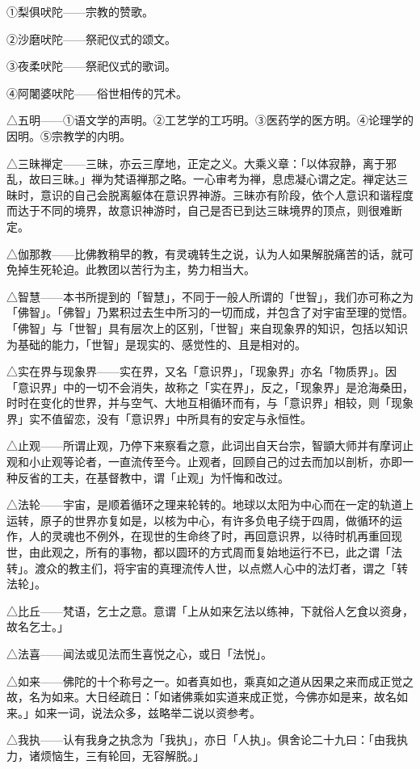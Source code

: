 \documentclass[12pt,twoside,openany]{book}
\begin{document}
①梨俱吠陀——宗教的赞歌。

②沙磨吠陀——祭祀仪式的颂文。

③夜柔吠陀——祭祀仪式的歌词。

④阿闍婆吠陀——俗世相传的咒术。

△五明——①语文学的声明。②工艺学的工巧明。③医药学的医方明。④论理学的因明。⑤宗教学的内明。

△三昧禅定——三昧，亦云三摩地，正定之义。大乘义章：「以体寂静，离于邪乱，故曰三昧。」禅为梵语禅那之略。一心审考为禅，息虑凝心谓之定。禅定达三昧时，意识的自己会脱离躯体在意识界神游。三昧亦有阶段，依个人意识和谐程度而达于不同的境界，故意识神游时，自己是否已到达三昧境界的顶点，则很难断定。

△伽那教——比佛教稍早的教，有灵魂转生之说，认为人如果解脱痛苦的话，就可免掉生死轮迫。此教团以苦行为主，势力相当大。

△智慧——本书所提到的「智慧」，不同于一般人所谓的「世智」，我们亦可称之为「佛智」。「佛智」乃累积过去生中所习的一切而成，并包含了对宇宙至理的觉悟。「佛智」与「世智」具有层次上的区别，「世智」来自现象界的知识，包括以知识为基础的能力，「世智」是现实的、感觉性的、且是相对的。

△实在界与现象界——实在界，又名「意识界」，「现象界」亦名「物质界」。因「意识界」中的一切不会消失，故称之「实在界」，反之，「现象界」是沧海桑田，时时在变化的世界，并与空气、大地互相循环而有，与「意识界」相较，则「现象界」实不值留恋，没有「意识界」中所具有的安定与永恒性。

△止观——所谓止观，乃停下来察看之意，此词出自天台宗，智顗大师并有摩诃止观和小止观等论者，一直流传至今。止观者，回顾自己的过去而加以剖析，亦即一种反省的工夫，在基督教中，谓「止观」为忏悔和改过。

△法轮——宇宙，是顺着循环之理来轮转的。地球以太阳为中心而在一定的轨道上运转，原子的世界亦复如是，以核为中心，有许多负电子绕于四周，做循环的运作，人的灵魂也不例外，在现世的生命终了时，再回意识界，以待时机再重回现世，由此观之，所有的事物，都以圆环的方式周而复始地运行不已，此之谓「法转」。渡众的教主们，将宇宙的真理流传人世，以点燃人心中的法灯者，谓之「转法轮」。

△比丘——梵语，乞士之意。意谓「上从如来乞法以练神，下就俗人乞食以资身，故名乞士。」

△法喜——闻法或见法而生喜悦之心，或日「法悦」。

△如来——佛陀的十个称号之一。如者真如也，乘真如之道从因果之来而成正觉之故，名为如来。大日经疏日：「如诸佛乘如实道来成正觉，今佛亦如是来，故名如来。」如来一词，说法众多，兹略举二说以资参考。

△我执——认有我身之执念为「我执」，亦日「人执」。俱舍论二十九曰：「由我执力，诸烦恼生，三有轮回，无容解脱。」
\end{document}
